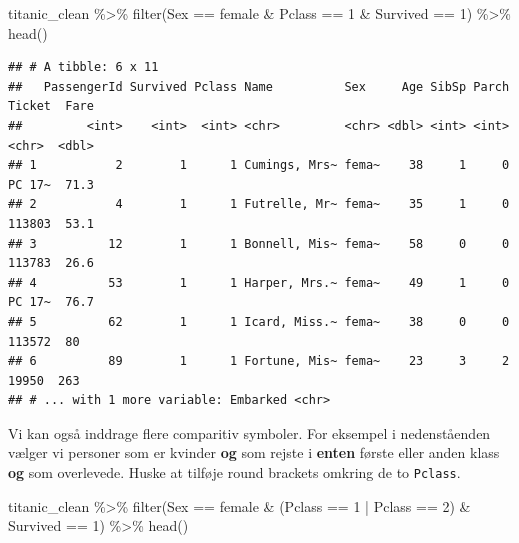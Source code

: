 \documentclass[
]{book}
\newenvironment{Shaded}{\begin{snugshade}}{\end{snugshade}}
\newcommand{\DecValTok}[1]{\textcolor[rgb]{0.00,0.00,0.81}{#1}}
\newcommand{\FunctionTok}[1]{\textcolor[rgb]{0.00,0.00,0.00}{#1}}
\newcommand{\NormalTok}[1]{#1}
\newcommand{\SpecialCharTok}[1]{\textcolor[rgb]{0.00,0.00,0.00}{#1}}
\newcommand{\StringTok}[1]{\textcolor[rgb]{0.31,0.60,0.02}{#1}}
\begin{document}
\begin{Shaded}
\begin{Highlighting}[]
\NormalTok{titanic\_clean }\SpecialCharTok{\%\textgreater{}\%} 
    \FunctionTok{filter}\NormalTok{(Sex }\SpecialCharTok{==} \StringTok{\textquotesingle{}female\textquotesingle{}} \SpecialCharTok{\&}\NormalTok{ Pclass }\SpecialCharTok{==} \DecValTok{1} \SpecialCharTok{\&}\NormalTok{ Survived }\SpecialCharTok{==} \DecValTok{1}\NormalTok{) }\SpecialCharTok{\%\textgreater{}\%}
    \FunctionTok{head}\NormalTok{()}
\end{Highlighting}
\end{Shaded}

\begin{verbatim}
## # A tibble: 6 x 11
##   PassengerId Survived Pclass Name          Sex     Age SibSp Parch Ticket  Fare
##         <int>    <int>  <int> <chr>         <chr> <dbl> <int> <int> <chr>  <dbl>
## 1           2        1      1 Cumings, Mrs~ fema~    38     1     0 PC 17~  71.3
## 2           4        1      1 Futrelle, Mr~ fema~    35     1     0 113803  53.1
## 3          12        1      1 Bonnell, Mis~ fema~    58     0     0 113783  26.6
## 4          53        1      1 Harper, Mrs.~ fema~    49     1     0 PC 17~  76.7
## 5          62        1      1 Icard, Miss.~ fema~    38     0     0 113572  80  
## 6          89        1      1 Fortune, Mis~ fema~    23     3     2 19950  263  
## # ... with 1 more variable: Embarked <chr>
\end{verbatim}

Vi kan også inddrage flere comparitiv symboler. For eksempel i nedenståenden vælger vi personer som er kvinder \textbf{og} som rejste i \textbf{enten} første eller anden klass \textbf{og} som overlevede. Huske at tilføje round brackets omkring de to \texttt{Pclass}.

\begin{Shaded}
\begin{Highlighting}[]
\NormalTok{titanic\_clean }\SpecialCharTok{\%\textgreater{}\%} 
    \FunctionTok{filter}\NormalTok{(Sex }\SpecialCharTok{==} \StringTok{\textquotesingle{}female\textquotesingle{}} \SpecialCharTok{\&}\NormalTok{ (Pclass }\SpecialCharTok{==} \DecValTok{1} \SpecialCharTok{|}\NormalTok{ Pclass }\SpecialCharTok{==} \DecValTok{2}\NormalTok{) }\SpecialCharTok{\&}\NormalTok{ Survived }\SpecialCharTok{==} \DecValTok{1}\NormalTok{) }\SpecialCharTok{\%\textgreater{}\%}
    \FunctionTok{head}\NormalTok{()}
\end{Highlighting}
\end{Shaded}
\end{document}
